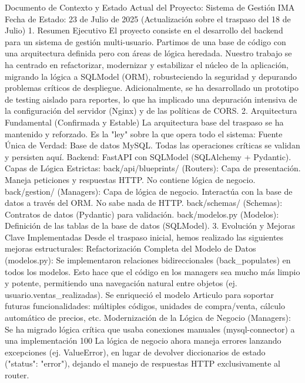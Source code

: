 Documento de Contexto y Estado Actual del Proyecto: Sistema de Gestión IMA
Fecha de Estado: 23 de Julio de 2025 (Actualización sobre el traspaso del 18 de Julio)
1. Resumen Ejecutivo
El proyecto consiste en el desarrollo del backend para un sistema de gestión multi-usuario. Partimos de una base de código con una arquitectura definida pero con áreas de lógica heredada. Nuestro trabajo se ha centrado en refactorizar, modernizar y estabilizar el núcleo de la aplicación, migrando la lógica a SQLModel (ORM), robusteciendo la seguridad y depurando problemas críticos de despliegue. Adicionalmente, se ha desarrollado un prototipo de testing aislado para reportes, lo que ha implicado una depuración intensiva de la configuración del servidor (Nginx) y de las políticas de CORS.
2. Arquitectura Fundamental (Confirmada y Estable)
La arquitectura base del traspaso se ha mantenido y reforzado. Es la "ley" sobre la que opera todo el sistema:
Fuente Única de Verdad: Base de datos MySQL. Todas las operaciones críticas se validan y persisten aquí.
Backend: FastAPI con SQLModel (SQLAlchemy + Pydantic).
Capas de Lógica Estrictas:
back/api/blueprints/ (Routers): Capa de presentación. Maneja peticiones y respuestas HTTP. No contiene lógica de negocio.
back/gestion/ (Managers): Capa de lógica de negocio. Interactúa con la base de datos a través del ORM. No sabe nada de HTTP.
back/schemas/ (Schemas): Contratos de datos (Pydantic) para validación.
back/modelos.py (Modelos): Definición de las tablas de la base de datos (SQLModel).
3. Evolución y Mejoras Clave Implementadas
Desde el traspaso inicial, hemos realizado las siguientes mejoras estructurales:
Refactorización Completa del Modelo de Datos (modelos.py):
Se implementaron relaciones bidireccionales (back_populates) en todos los modelos. Esto hace que el código en los managers sea mucho más limpio y potente, permitiendo una navegación natural entre objetos (ej. usuario.ventas_realizadas).
Se enriqueció el modelo Articulo para soportar futuras funcionalidades: múltiples códigos, unidades de compra/venta, cálculo automático de precios, etc.
Modernización de la Lógica de Negocio (Managers):
Se ha migrado lógica crítica que usaba conexiones manuales (mysql-connector) a una implementación 100%
La lógica de negocio ahora maneja errores lanzando excepciones (ej. ValueError), en lugar de devolver diccionarios de estado ({"status": "error"}), dejando el manejo de respuestas HTTP exclusivamente al router.
